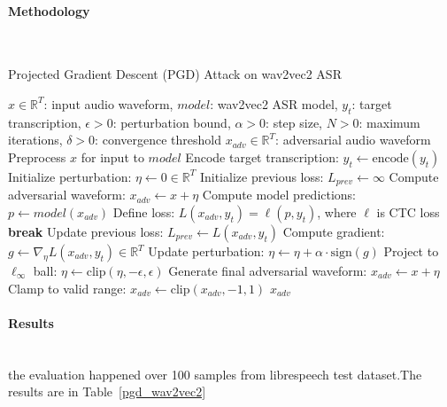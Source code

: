 \documentclass[../main.tex]{subfiles}
\begin{document}
\paragraph{Methodology}\leavevmode\\
\begin{breakablealgorithm}{Projected Gradient Descent (PGD) Attack on wav2vec2 ASR}
\begin{algorithmic}[1]
\Require $x \in \mathbb{R}^T$: input audio waveform, $model$: wav2vec2 ASR model, $y_t$: target transcription, $\epsilon > 0$: perturbation bound, $\alpha > 0$: step size, $N > 0$: maximum iterations, $\delta > 0$: convergence threshold
\Ensure $x_{adv} \in \mathbb{R}^T$: adversarial audio waveform
\State Preprocess $x$ for input to $model$ 
\State Encode target transcription: $y_t \gets \text{encode}(y_t)$ 
\State Initialize perturbation: $\eta \gets 0 \in \mathbb{R}^T$ 
\State Initialize previous loss: $L_{prev} \gets \infty$
    \State Compute adversarial waveform: $x_{adv} \gets x + \eta$
    \State Compute model predictions: $p \gets model(x_{adv})$ 
    \State Define loss: $L(x_{adv}, y_t) = \ell(p, y_t)$, where $\ell$ is CTC loss 
        \State \textbf{break} 
    \EndIf
    \State Update previous loss: $L_{prev} \gets L(x_{adv}, y_t)$
    \State Compute gradient: $g \gets \nabla_{\eta} L(x_{adv}, y_t) \in \mathbb{R}^T$ 
    \State Update perturbation: $\eta \gets \eta + \alpha \cdot \text{sign}(g)$
    \State Project to $\ell_\infty$ ball: $\eta \gets \text{clip}(\eta, -\epsilon, \epsilon)$ 
\EndFor
\State Generate final adversarial waveform: $x_{adv} \gets x + \eta$
\State Clamp to valid range: $x_{adv} \gets \text{clip}(x_{adv}, -1, 1)$ 
\State \Return $x_{adv}$ 
\end{algorithmic}
\end{breakablealgorithm}


\paragraph{Results}\leavevmode\\
the evaluation happened over 100 samples from librespeech test dataset.The results are in Table~\ref{pgd_wav2vec2}
\end{document}
